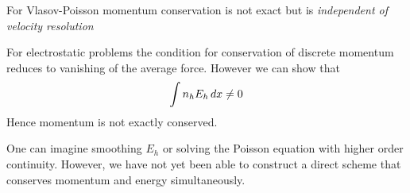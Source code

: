 \documentclass[pdf]{beamer}
\newcommand{\mypause}{}
\theoremstyle{definition}
\begin{document}
\begin{frame}{For Vlasov-Poisson momentum conservation is not exact
    but is \emph{independent of velocity resolution}}%

  For electrostatic problems the condition for conservation of
  discrete momentum reduces to vanishing of the average force. However
  we can show that
  \begin{align*}
    \int n_h E_h\thinspace dx \ne 0
  \end{align*}
  Hence momentum is not exactly conserved.

  \mypause One can imagine smoothing $E_h$ or solving the Poisson
  equation with higher order continuity. However, we have not yet been
  able to construct a direct scheme that conserves momentum and energy
  simultaneously.
\end{frame}
\end{document}
